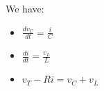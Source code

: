 \documentclass[preview]{standalone}
\begin{document}
\begin{center}
\raggedright
                We have:
                \begin{itemize}
                  \item $\frac{dv_C}{dt} = \frac{i}{C}$
                  \item $\frac{di}{dt} = \frac{v_L}{L}$
                  \item $v_T - Ri = v_C + v_L $
                \end{itemize}
\end{center}
\end{document}
